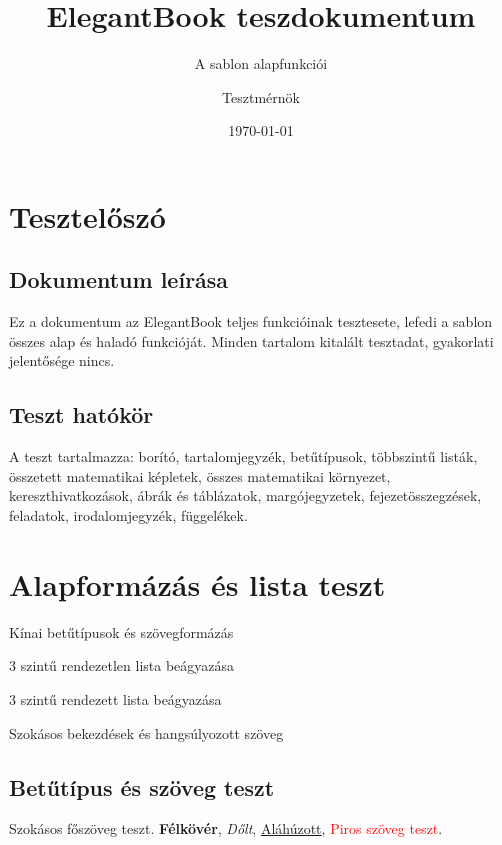 \documentclass[hu]{../../elegantbook}
\title{ElegantBook teszdokumentum}
\subtitle{A sablon alapfunkciói}
\author{Tesztmérnök}
\institute{Sablon Tesztcsoport}
\date{\today}
\begin{document}
\maketitle
\frontmatter
\tableofcontents

\setcounter{page}{0}
\chapter*{Tesztelőszó}
\section*{Dokumentum leírása}
Ez a dokumentum az ElegantBook teljes funkcióinak tesztesete, lefedi a sablon összes alap és haladó funkcióját. Minden tartalom kitalált tesztadat, gyakorlati jelentősége nincs.
\newpage
\section*{Teszt hatókör}
A teszt tartalmazza: borító, tartalomjegyzék, betűtípusok, többszintű listák, összetett matematikai képletek, összes matematikai környezet, kereszthivatkozások, ábrák és táblázatok, margójegyzetek, fejezetösszegzések, feladatok, irodalomjegyzék, függelékek.

\mainmatter

\chapter{Alapformázás és lista teszt}
\begin{introduction}
\item Kínai betűtípusok és szövegformázás
\item 3 szintű rendezetlen lista beágyazása
\item 3 szintű rendezett lista beágyazása
\item Szokásos bekezdések és hangsúlyozott szöveg
\end{introduction}

\section{Betűtípus és szöveg teszt}
Szokásos főszöveg teszt. \textbf{Félkövér}, \textit{Dőlt}, \underline{Aláhúzott}, \textcolor{red}{Piros szöveg teszt}.
\end{document}
